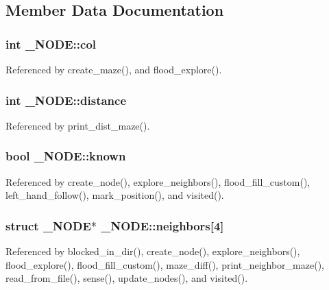 \subsection{Member Data Documentation}
\subsubsection[{col}]{\setlength{\rightskip}{0pt plus 5cm}int \-\_\-\-N\-O\-D\-E\-::col}\label{struct__NODE_afb55c48a3be1271f0750fb74eb2eb8f7}


Referenced by create\-\_\-maze(), and flood\-\_\-explore().

\subsubsection[{distance}]{\setlength{\rightskip}{0pt plus 5cm}int \-\_\-\-N\-O\-D\-E\-::distance}\label{struct__NODE_a6da4411a570a71b33e7ea9afed281c39}


Referenced by print\-\_\-dist\-\_\-maze().

\subsubsection[{known}]{\setlength{\rightskip}{0pt plus 5cm}bool \-\_\-\-N\-O\-D\-E\-::known}\label{struct__NODE_a5cca231699bb41ced84dcd000bb6c117}


Referenced by create\-\_\-node(), explore\-\_\-neighbors(), flood\-\_\-fill\-\_\-custom(), left\-\_\-hand\-\_\-follow(), mark\-\_\-position(), and visited().

\subsubsection[{neighbors}]{\setlength{\rightskip}{0pt plus 5cm}struct {\bf \-\_\-\-N\-O\-D\-E}$\ast$ \-\_\-\-N\-O\-D\-E\-::neighbors[4]}\label{struct__NODE_ab474f61f2dea616a934f16db645e83b0}


Referenced by blocked\-\_\-in\-\_\-dir(), create\-\_\-node(), explore\-\_\-neighbors(), flood\-\_\-explore(), flood\-\_\-fill\-\_\-custom(), maze\-\_\-diff(), print\-\_\-neighbor\-\_\-maze(), read\-\_\-from\-\_\-file(), sense(), update\-\_\-nodes(), and visited().

